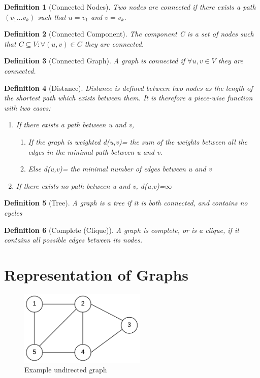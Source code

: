 \documentclass[12pt,letterpaper]{article}
\newtheorem{definition}{Definition}[section]
\begin{document}
\begin{definition}[Connected Nodes]\hfill \break
Two nodes are connected if there exists a path $(v_1\dots v_k)$ such that $u=v_1$ and $v=v_k$.
\end{definition}
\begin{definition}[Connected Component]\hfill \break
The component C is a set of nodes such that $C\subseteq V: \forall (u,v) \in C$ they are connected.
\end{definition}
\begin{definition}[Connected Graph]\hfill \break
A graph is connected if $\forall u,v\in V$ they are connected.
\end{definition}
\begin{definition}[Distance]\hfill \break
Distance is defined between two nodes as the length of the shortest path which exists between them. It is therefore a piece-wise function with two cases:\\
\begin{enumerate}
\item If there exists a path between u and v, 
\begin{enumerate}
\item If the graph is weighted d(u,v)= the sum of the weights between all the edges in the minimal path between u and v.
\item Else d(u,v)= the minimal number of edges between u and v 
\end{enumerate} 
\item If there exists no path between u and v, d(u,v)=$\infty$
\end{enumerate}
\end{definition}
\begin{definition}[Tree]\hfill \break
A graph is a tree if it is both connected, and contains no cycles
\end{definition}
\begin{definition}[Complete (Clique)]\hfill \break
A graph is complete, or is a clique, if it contains all possible edges between its nodes. 
\end{definition}
\section{Representation of Graphs}
\begin{figure}[h]
\centering
\includegraphics[width=6cm]{defGraph1}
\caption{Example undirected graph}
\end{figure}
\FloatBarrier
\end{document}
